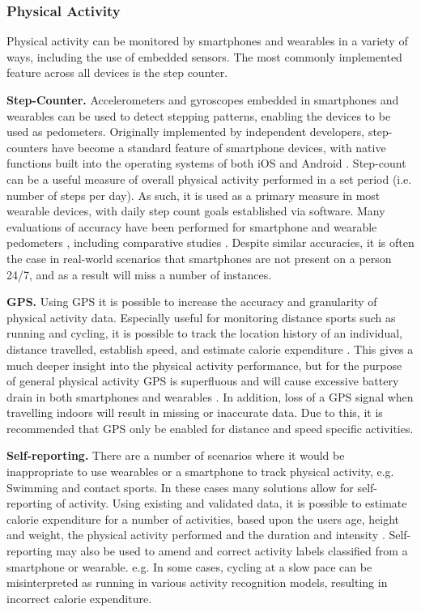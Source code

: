 \subsubsection{Physical Activity}
Physical activity can be monitored by smartphones and wearables in a variety of ways, including the use of embedded sensors. The most commonly implemented feature across all devices is the step counter.

\textbf{Step-Counter.}
Accelerometers and gyroscopes embedded in smartphones and wearables can be used to detect stepping patterns, enabling the devices to be used as pedometers. Originally implemented by independent developers, step-counters have become a standard feature of smartphone devices, with native functions built into the operating systems of both iOS and Android \cite{Orr2015}. Step-count can be a useful measure of overall physical activity performed in a set period (i.e. number of steps per day). As such, it is used as a primary measure in most wearable devices, with daily step count goals established via software. Many evaluations of accuracy have been performed for smartphone and wearable pedometers \cite{Cleland2012, Cleland2013, Yang2010}, including comparative studies \cite{El-Amrawy2015}. Despite similar accuracies, it is often the case in real-world scenarios that smartphones are not present on a person 24/7, and as a result will miss a number of instances.

\textbf{GPS.}
Using GPS it is possible to increase the accuracy and granularity of physical activity data. Especially useful for monitoring distance sports such as running and cycling, it is possible to track the location history of an individual, distance travelled, establish speed, and estimate calorie expenditure \cite{Zhan2012, BUTTE2012}. This gives a much deeper insight into the physical activity performance, but for the purpose of general physical activity GPS is superfluous and will cause excessive battery drain in both smartphones and wearables \cite{BUTTE2012}. In addition, loss of a GPS signal when travelling indoors will result in missing or inaccurate data. Due to this, it is recommended that GPS only be enabled for distance and speed specific activities.

\textbf{Self-reporting.}
There are a number of scenarios where it would be inappropriate to use wearables or a smartphone to track physical activity, e.g. Swimming and contact sports. In these cases many solutions allow for self-reporting of activity. Using existing and validated data, it is possible to estimate calorie expenditure for a number of activities, based upon the users age, height and weight, the physical activity performed and the duration and intensity \cite{Black1996}. Self-reporting may also be used to amend and correct activity labels classified from a smartphone or wearable. e.g. In some cases, cycling at a slow pace can be misinterpreted as running in various activity recognition models, resulting in incorrect calorie expenditure\cite{Ferguson2015}.

